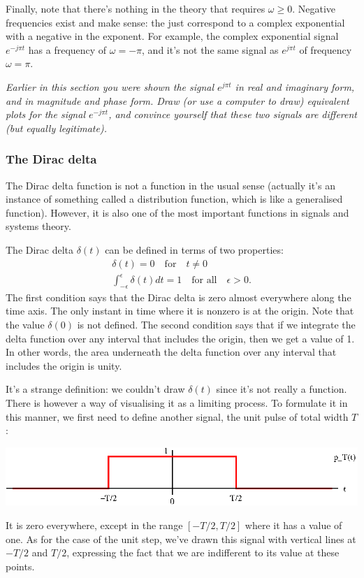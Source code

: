 \documentclass[10pt]{beamer}
\begin{document}
Finally, note that there's nothing in the theory that requires $\omega \geq 0$.  Negative frequencies exist and make sense:  the just correspond to a complex exponential with a negative in the exponent.  For example, the complex exponential signal $e^{-j \pi t}$ has a frequency of $\omega = - \pi$, and it's not the same signal as $e^{j \pi t}$ of frequency $\omega = \pi$.  

{\em Earlier in this section you were shown the signal $e^{j \pi t}$ in real and imaginary form, and in magnitude and phase form.   Draw (or use a computer to draw) equivalent plots for the signal $e^{-j \pi t}$, and convince yourself that these two signals are different (but equally legitimate).}

\subsubsection{The Dirac delta}

The Dirac delta function is not a function in the usual sense (actually it's an instance of something called a distribution function, which is like a generalised function).  However, it is also one of the most important functions in signals and systems theory.

The Dirac delta $\delta(t)$ can be defined in terms of two properties:
\begin{gather*}
  \delta(t) = 0 \quad \text{for} \quad t \neq 0 \\
  \int_{-\epsilon}^{\epsilon} \delta(t) dt = 1 \quad \text{for all} \quad \epsilon > 0.
\end{gather*}
The first condition says that the Dirac delta is zero almost everywhere along the time axis.  The only instant in time where it is nonzero is at the origin.  Note that the value $\delta(0)$ is not defined.  The second condition says that if we integrate the delta function over any interval that includes the origin, then we get a value of 1.  In other words, the area underneath the delta function over any interval that includes the origin is unity.  

It's a strange definition:  we couldn't draw $\delta(t)$ since it's not really a function.  There is however a way of visualising it as a limiting process.  To formulate it in this manner, we first need to define another signal, the unit pulse of total width $T$:
\begin{center}
  \includegraphics{unitpulse}
\end{center}
It is zero everywhere, except in the range $[-T/2, T/2]$ where it has a value of one.  As for the case of the unit step, we've drawn this signal with vertical lines at $-T/2$ and $T/2$, expressing the fact that we are indifferent to its value at these points.  
\end{document}
